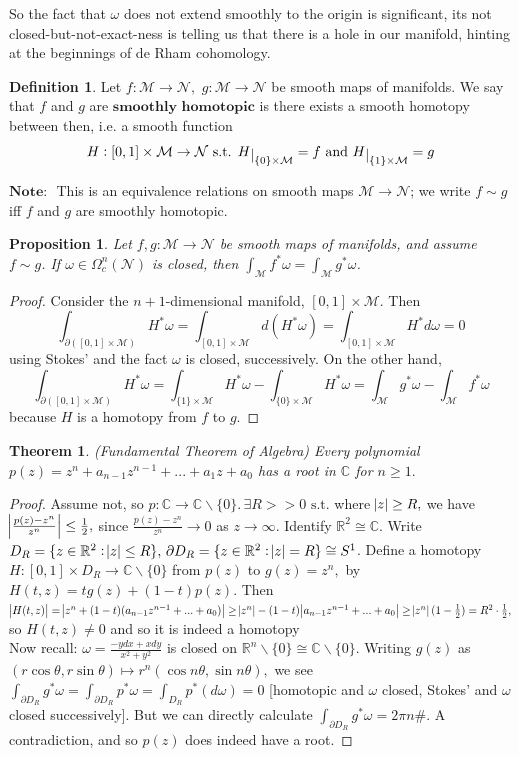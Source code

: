 \documentclass[10pt]{article}
\theoremstyle{plain}
\newtheorem{theorem}{Theorem}[section]
\newtheorem{prop}[thm]{Proposition}
\theoremstyle{definition}
\newtheorem{defn}[thm]{Definition} %
\newcommand{\myand}{\text{ and }}
\newcommand{\st}{\text{ s.t. }}
\newcommand{\Note}{\textbf{Note: }}
\newcommand{\Real}{\mathbb{R}}
\newcommand{\man}{\mathcal{M}}
\newcommand{\nan}{\mathcal{N}}
\newcommand{\compactpformnan}[1]{\Omega^{#1}_c(\nan)}
\newcommand{\dx}{dx}
\newcommand{\deriv}{d}
\newcommand{\dw}{d\omega}
\def\restrict#1{\raise-.5ex\hbox{\ensuremath|}_{#1}}
\begin{document}
So the fact that $\omega$ does not extend smoothly to the origin is significant, its not closed-but-not-exact-ness is telling us that there is a hole in our manifold, hinting at the beginnings of de Rham cohomology.
\begin{defn}
Let $f : \man \to \nan,$ $g:\man \to \nan$ be smooth maps of manifolds. We say that $f$ and $g$ are $\textbf{smoothly homotopic}$ is there exists a smooth homotopy between then, i.e. a smooth function 
$$H: [0,1] \times \man \to \nan \st H\restrict{\{0\} \times \man} = f \myand H\restrict{\{1\} \times\man} = g$$
\end{defn}
$\Note$ This is an equivalence relations on smooth maps $\man \to \nan$; we write $f \sim g$ iff $f$ and $g$ are smoothly homotopic.
\begin{prop}\label{prop:HomotopyInvarianceOfIntegral}
Let $f,g : \man \to \nan$ be smooth maps of manifolds, and assume $f\sim g$. If $\omega \in \compactpformnan{n}$ is closed, then $\int_\man f ^* \omega = \int_\man g^* \omega$.
\end{prop}
\begin{proof}
Consider the $n+1$-dimensional manifold, $[0,1]\times \man$. Then 
$$\int_{\partial ([0,1]\times \man)} H^*\omega = \int_{[0,1]\times \man} \deriv ( H^* \omega) = \int_{[0,1]\times\man} H^*\dw = 0$$
using Stokes' and the fact $\omega$ is closed, successively. On the other hand,
$$\int_{\partial ([0,1]\times \man)} H^* \omega = \int_{\{1\}\times \man} H^*\omega - \int_{\{0\}\times \man} H^*\omega = \int_\man g^*\omega - \int_\man f^* \omega$$
because $H$ is a homotopy from $f$ to $g$.
\end{proof}
\begin{theorem}
(Fundamental Theorem of Algebra) Every polynomial $p(z) = z^n + a_{n-1}z^{n-1} + ... + a_1 z + a_0$ has a root in $\mathbb{C}$ for $n \geq 1.$
\end{theorem}
\begin{proof}
Assume not, so $p: \mathbb{C} \to \mathbb{C}\backslash \{0\}.\, \exists R > > 0 \st$where $\abs{z} \geq R,$ we have $\abs{\frac{p(z)-z^n}{z^n}}\leq \frac{1}{2},$ since $\frac{p(z) - z^n}{z^n} \to 0$ as $z\to \infty.$ Identify $\Real^2 \cong \mathbb{C}$. Write $D_R = \{z\in \Real^2 : \abs{z} \leq R\},\, \partial D_R = \{z\in \Real^2 : \abs{z} = R\}\cong S^1$. Define a homotopy $H : [0,1] \times D_R \to \mathbb{C}\backslash\{0\}$ from $p(z)$ to $g(z) = z^n,$ by $H(t,z) = tg(z) + (1-t)p(z).$ Then $\abs{H(t,z)} = \abs{z^n +(1-t)(a_{n-1}z^{n-1} +...+a_0)}\geq \abs{z^n} -(1-t)\abs{a_{n-1}z^{n-1} + ... + a_0} \geq \abs{z^n}(1-\frac{1}{2}) = R^2 \cdot \frac{1}{2},$ so $H(t,z) \neq 0$ and so it is indeed a homotopy\\
Now recall: $\omega = \frac{-y \dx +x dy}{x^2+y^2}$ is closed on $\Real^n\backslash \{0\} \cong \mathbb{C}\backslash \{0\}.$ Writing $g(z)$ as $(r\cos\theta,r\sin\theta) \mapsto r^n (\cos n\theta,\sin n \theta),$ we see $\int_{\partial D_R} g^* \omega = \int_{\partial D_R} p^* \omega = \int_{D_R} p^*(\dw) = 0$ [homotopic and $\omega$ closed, Stokes' and $\omega$ closed successively]. But we can directly calculate $\int_{\partial D_R} g^*\omega = 2\pi n \#$. A contradiction, and so $p(z)$ does indeed have a root.
\end{proof}
\end{document}
